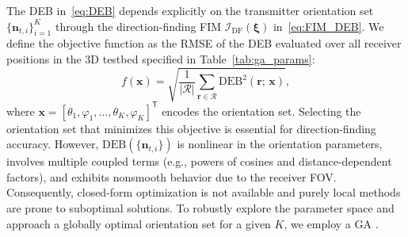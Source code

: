\documentclass[journal]{IEEEtran}
\begin{document}
The DEB in~\eqref{eq:DEB} depends explicitly on the transmitter orientation set $\{\mathbf{n}_{t,i}\}_{i=1}^K$ through the direction-finding FIM $\mathcal{I}_{\mathrm{DF}}(\boldsymbol\xi)$ in~\eqref{eq:FIM_DEB}. We define the objective function as the RMSE of the DEB evaluated over all receiver positions in the 3D testbed specified in Table~\ref{tab:ga_params}:
\begin{equation}
f(\mathbf{x}) = \sqrt{\frac{1}{|\mathcal{R}|}\sum_{\mathbf{r}\in\mathcal{R}}\mathrm{DEB}^2(\mathbf{r};\,\mathbf{x})},
\label{eq:GA_objective}
\end{equation}
where $\mathbf{x}=[\theta_1,\varphi_1,\ldots,\theta_K,\varphi_K]^{\mathsf T}$ encodes the orientation set.
Selecting the orientation set that minimizes this objective is essential for direction-finding accuracy. However, \(\mathrm{DEB}(\{\mathbf n_{t,i}\})\) is nonlinear in the orientation parameters, involves multiple coupled terms (e.g., powers of cosines and distance-dependent factors), and exhibits nonsmooth behavior due to the receiver FOV. Consequently, closed-form optimization is not available and purely local methods are prone to suboptimal solutions. To robustly explore the parameter space and approach a globally optimal orientation set for a given \(K\), we employ a GA \cite{Haupt2004}.
\end{document}
